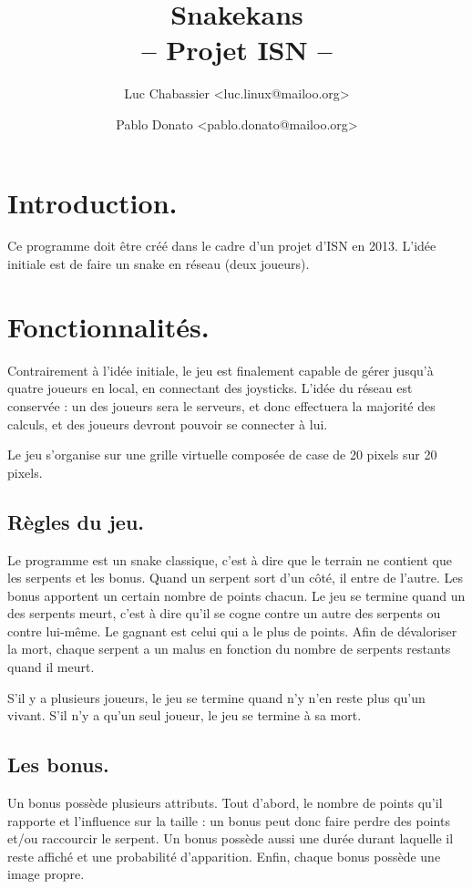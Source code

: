 \documentclass{article}
\title{Snakekans\\-- Projet ISN --}
\author{Luc Chabassier <luc.linux@mailoo.org> \and Pablo Donato <pablo.donato@mailoo.org>}
\begin{document}
\maketitle

\tableofcontents

\section{Introduction.}
Ce programme doit être créé dans le cadre d'un projet d'ISN en 2013. L'idée initiale est de faire un snake en réseau (deux joueurs).

\section{Fonctionnalités.}
Contrairement à l'idée initiale, le jeu est finalement capable de gérer jusqu'à quatre joueurs en local, en connectant des joysticks. L'idée du réseau est conservée : un des joueurs sera le serveurs, et donc effectuera la majorité des calculs, et des joueurs devront pouvoir se connecter à lui.

Le jeu s'organise sur une grille virtuelle composée de case de 20 pixels sur 20 pixels.

\subsection{Règles du jeu.}
Le programme est un snake classique, c'est à dire que le terrain ne contient que les serpents et les bonus. Quand un serpent sort d'un côté, il entre de l'autre. Les bonus apportent un certain nombre de points chacun. Le jeu se termine quand un des serpents meurt, c'est à dire qu'il se cogne contre un autre des serpents ou contre lui-même. Le gagnant est celui qui a le plus de points. Afin de dévaloriser la mort, chaque serpent a un malus en fonction du nombre de serpents restants quand il meurt.

S'il y a plusieurs joueurs, le jeu se termine quand n'y n'en reste plus qu'un vivant. S'il n'y a qu'un seul joueur, le jeu se termine à sa mort.

\subsection{Les bonus.}
Un bonus possède plusieurs attributs. Tout d'abord, le nombre de points qu'il rapporte et l'influence sur la taille : un bonus peut donc faire perdre des points et/ou raccourcir le serpent. Un bonus possède aussi une durée durant laquelle il reste affiché et une probabilité d'apparition. Enfin, chaque bonus possède une image propre.
\end{document}
